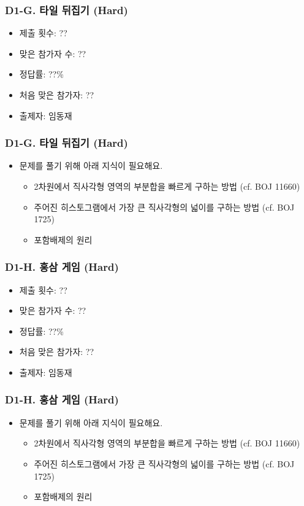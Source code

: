 \documentclass[xetex]{beamer}
\begin{document}
\begin{frame}
  \frametitle{D1-G. 타일 뒤집기 (Hard)}
  \begin{itemize}
    \item 제출 횟수: ??
    \item 맞은 참가자 수: ??
    \item 정답률: ??\%
    \item 처음 맞은 참가자: ??
    \item 출제자: 임동재
  \end{itemize}
\end{frame}

\begin{frame}
  \frametitle{D1-G. 타일 뒤집기 (Hard)}
  \begin{itemize}
    \item 문제를 풀기 위해 아래 지식이 필요해요.
    \begin{itemize}
      \item 2차원에서 직사각형 영역의 부분합을 빠르게 구하는 방법 (cf. BOJ 11660)
      \item 주어진 히스토그램에서 가장 큰 직사각형의 넓이를 구하는 방법 (cf. BOJ 1725)
      \item 포함배제의 원리
    \end{itemize}
  \end{itemize}
\end{frame}

\begin{frame}
  \frametitle{D1-H. 홍삼 게임 (Hard)}
  \begin{itemize}
    \item 제출 횟수: ??
    \item 맞은 참가자 수: ??
    \item 정답률: ??\%
    \item 처음 맞은 참가자: ??
    \item 출제자: 임동재
  \end{itemize}
\end{frame}

\begin{frame}
  \frametitle{D1-H. 홍삼 게임 (Hard)}
  \begin{itemize}
    \item 문제를 풀기 위해 아래 지식이 필요해요.
    \begin{itemize}
      \item 2차원에서 직사각형 영역의 부분합을 빠르게 구하는 방법 (cf. BOJ 11660)
      \item 주어진 히스토그램에서 가장 큰 직사각형의 넓이를 구하는 방법 (cf. BOJ 1725)
      \item 포함배제의 원리
    \end{itemize}
  \end{itemize}
\end{frame}
\end{document}
